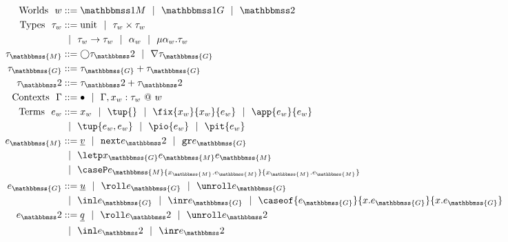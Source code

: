 
\newcommand{\exprM}{e_\mathbbmss{M}}
\newcommand{\exprG}{e_\mathbbmss{G}}
\newcommand{\exprT}{e_\bbtwo}
\newcommand{\varM}{x_\mathbbmss{M}}
\newcommand{\varG}{x_\mathbbmss{G}}
\newcommand{\varT}{x_\bbtwo}
\newcommand{\typeM}{\tau_\mathbbmss{M}}
\newcommand{\typeG}{\tau_\mathbbmss{G}}
\newcommand{\typeT}{\tau_\bbtwo}

\begin{figure}
\begin{abstrsyn}
\[\begin{aligned}
\text{Worlds}\ \ 
\world &::= \bbonem \gbar \bbonep \gbar \bbtwo  \\
%
\text{Types}\ \ 
\type_w &::= \text{unit}
 \gbar \type_w \times \type_w \\
&\gbar \type_w \to \type_w
 \gbar \alpha_w \gbar \mu \alpha_w.\tau_w \\
\typeM &::= \fut \typeT \gbar \curr \typeG \\
%
\typeG &::= \typeG + \typeG \\
%
\typeT &::= \typeT + \typeT \\
%
%
\text{Contexts}\ \ 
\context &::=\emptyC
 \gbar \context, x_w:\tau_w~@~w \\
%
\text{Terms}\ \ 
e_w &::= x_w
 \gbar \tup{}
 \gbar \fix {x_w} {x_w} {e_w}
 \gbar \app {e_w} {e_w} \\
&\gbar \tup{e_w, e_w} 
 \gbar \pio {e_w} 
 \gbar \pit {e_w} \\
\exprM &::= \exv v
 \gbar \next \exprT 
 \gbar \pure \exprG \\
&\gbar \letp \varG \exprM \exprM \\
&\gbar \caseP \exprM {\varM.\exprM} {\varM.\exprM} \\
\exprG &::= \exv u
 \gbar \roll \exprG \gbar \unroll \exprG \\
&\gbar \inl \exprG \gbar \inr \exprG
 \gbar \caseof {\exprG}{\var.\exprG}{\var.\exprG} \\ 
\exprT &::= \exv q
 \gbar \roll \exprT \gbar \unroll \exprT \\
&\gbar \inl \exprT \gbar \inr \exprT

\end{aligned}\]
\end{abstrsyn}
\end{figure}
